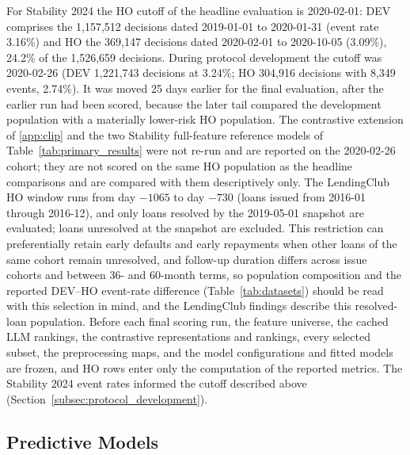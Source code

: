 \documentclass[final,5p,twocolumn]{elsarticle}
\begin{document}
For Stability 2024 the HO cutoff of the headline evaluation is 2020-02-01: DEV comprises the 1,157,512 decisions dated 2019-01-01 to 2020-01-31 (event rate 3.16\%) and HO the 369,147 decisions dated 2020-02-01 to 2020-10-05 (3.09\%), 24.2\% of the 1,526,659 decisions. During protocol development the cutoff was 2020-02-26 (DEV 1,221,743 decisions at 3.24\%; HO 304,916 decisions with 8,349 events, 2.74\%). It was moved 25 days earlier for the final evaluation, after the earlier run had been scored, because the later tail compared the development population with a materially lower-risk HO population. The contrastive extension of \ref{app:clip} and the two Stability full-feature reference models of Table~\ref{tab:primary_results} were not re-run and are reported on the 2020-02-26 cohort; they are not scored on the same HO population as the headline comparisons and are compared with them descriptively only. The LendingClub HO window runs from day $-1065$ to day $-730$ (loans issued from 2016-01 through 2016-12), and only loans resolved by the 2019-05-01 snapshot are evaluated; loans unresolved at the snapshot are excluded. This restriction can preferentially retain early defaults and early repayments when other loans of the same cohort remain unresolved, and follow-up duration differs across issue cohorts and between 36- and 60-month terms, so population composition and the reported DEV--HO event-rate difference (Table~\ref{tab:datasets}) should be read with this selection in mind, and the LendingClub findings describe this resolved-loan population. Before each final scoring run, the feature universe, the cached LLM rankings, the contrastive representations and rankings, every selected subset, the preprocessing maps, and the model configurations and fitted models are frozen, and HO rows enter only the computation of the reported metrics. The Stability 2024 event rates informed the cutoff described above (Section~\ref{subsec:protocol_development}).

\subsection{Predictive Models}
\label{subsec:models}
\end{document}

